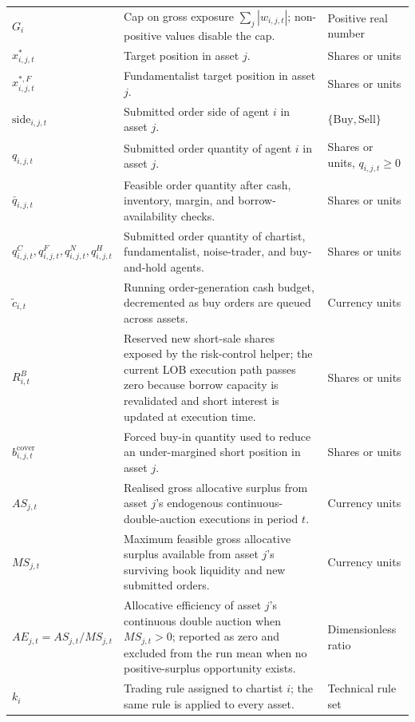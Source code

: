 \documentclass[12pt, a4paper]{article}
\begin{document}
\begin{longtable}{@{}L{0.22\textwidth}L{0.50\textwidth}L{0.20\textwidth}@{}}
        \(G_i\) & Cap on gross exposure \(\sum_j|w_{i,j,t}|\); non-positive values disable the cap. & Positive real number \\
        \(x_{i,j,t}^{\ast}\) & Target position in asset \(j\). & Shares or units \\
        \(x_{i,j,t}^{\ast,F}\) & Fundamentalist target position in asset \(j\). & Shares or units \\
        \(\mathrm{side}_{i,j,t}\) & Submitted order side of agent \(i\) in asset \(j\). & \(\{\mathrm{Buy},\mathrm{Sell}\}\) \\
        \(q_{i,j,t}\) & Submitted order quantity of agent \(i\) in asset \(j\). & Shares or units, \(q_{i,j,t}\ge0\) \\
        \(\bar q_{i,j,t}\) & Feasible order quantity after cash, inventory, margin, and borrow-availability checks. & Shares or units \\
        \(q_{i,j,t}^{C},q_{i,j,t}^{F},q_{i,j,t}^{N},q_{i,j,t}^{H}\) & Submitted order quantity of chartist, fundamentalist, noise-trader, and buy-and-hold agents. & Shares or units \\
        \(\tilde c_{i,t}\) & Running order-generation cash budget, decremented as buy orders are queued across assets. & Currency units \\
        \(R_{i,t}^{B}\) & Reserved new short-sale shares exposed by the risk-control helper; the current LOB execution path passes zero because borrow capacity is revalidated and short interest is updated at execution time. & Shares or units \\
        \(b_{i,j,t}^{\text{cover}}\) & Forced buy-in quantity used to reduce an under-margined short position in asset \(j\). & Shares or units \\
        \(AS_{j,t}\) & Realised gross allocative surplus from asset \(j\)'s endogenous continuous-double-auction executions in period \(t\). & Currency units \\
        \(MS_{j,t}\) & Maximum feasible gross allocative surplus available from asset \(j\)'s surviving book liquidity and new submitted orders. & Currency units \\
        \(AE_{j,t}=AS_{j,t}/MS_{j,t}\) & Allocative efficiency of asset \(j\)'s continuous double auction when \(MS_{j,t}>0\); reported as zero and excluded from the run mean when no positive-surplus opportunity exists. & Dimensionless ratio \\
        \(k_i\) & Trading rule assigned to chartist \(i\); the same rule is applied to every asset. & Technical rule set \\

\end{longtable}
\end{document}
